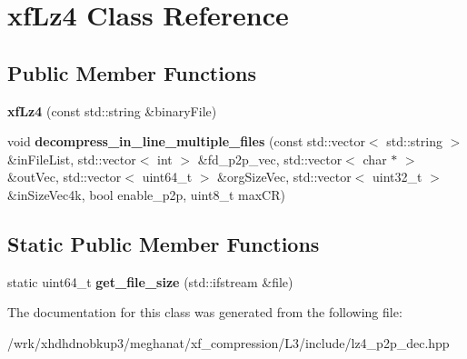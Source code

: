 \hypertarget{classxfLz4}{\section{xf\-Lz4 Class Reference}
\label{classxfLz4}
}
\subsection*{Public Member Functions}
\begin{DoxyCompactItemize}
\item 
\hypertarget{classxfLz4_aa8ba8ffba63ceb3d39a1600ccc36b227}{{\bfseries xf\-Lz4} (const std\-::string \&binary\-File)}\label{classxfLz4_aa8ba8ffba63ceb3d39a1600ccc36b227}

\item 
\hypertarget{classxfLz4_aa72cb068996c01bef9ecd3fa2315a697}{void {\bfseries decompress\-\_\-in\-\_\-line\-\_\-multiple\-\_\-files} (const std\-::vector$<$ std\-::string $>$ \&in\-File\-List, std\-::vector$<$ int $>$ \&fd\-\_\-p2p\-\_\-vec, std\-::vector$<$ char $\ast$ $>$ \&out\-Vec, std\-::vector$<$ uint64\-\_\-t $>$ \&org\-Size\-Vec, std\-::vector$<$ uint32\-\_\-t $>$ \&in\-Size\-Vec4k, bool enable\-\_\-p2p, uint8\-\_\-t max\-C\-R)}\label{classxfLz4_aa72cb068996c01bef9ecd3fa2315a697}

\end{DoxyCompactItemize}
\subsection*{Static Public Member Functions}
\begin{DoxyCompactItemize}
\item 
\hypertarget{classxfLz4_ae646fa73ab42f5b86172d5bedb18f8bd}{static uint64\-\_\-t {\bfseries get\-\_\-file\-\_\-size} (std\-::ifstream \&file)}\label{classxfLz4_ae646fa73ab42f5b86172d5bedb18f8bd}

\end{DoxyCompactItemize}


The documentation for this class was generated from the following file\-:\begin{DoxyCompactItemize}
\item 
/wrk/xhdhdnobkup3/meghanat/xf\-\_\-compression/\-L3/include/lz4\-\_\-p2p\-\_\-dec.\-hpp\end{DoxyCompactItemize}
